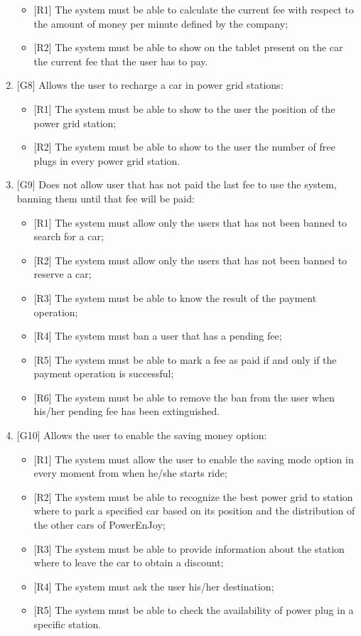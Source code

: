 \begin{enumerate}
\begin{itemize}
	\item {[R1]} The system must be able to calculate the current fee with respect to the amount of money per minute defined by the company;
	\item {[R2]} The system must be able to show on the tablet present on the car the current fee that the user has to pay.
\end{itemize}

\item {[G8]} Allows the user to recharge a car in power grid stations:

\begin{itemize}
	\item {[R1]} The system must be able to show to the user the position of the power grid station;
	\item {[R2]} The system must be able to show to the user the number of free plugs in every power grid station.
\end{itemize}

\item {[G9]} Does not allow user that has not paid the last fee to use the system, banning them until that fee will be paid:

\begin{itemize}
	\item {[R1]} The system must allow only the users that has not been banned to search for a car;
	\item {[R2]} The system must allow only the users that has not been banned to reserve a car;
	\item {[R3]} The system must be able to know the result of the payment operation;
	\item {[R4]} The system must ban a user that has a pending fee;
	\item {[R5]} The system must be able to mark a fee as paid if and only if the payment operation is successful;
	\item {[R6]} The system must be able to remove the ban from the user when his/her pending fee has been extinguished.
\end{itemize}

\item {[G10]} Allows the user to enable the saving money option:

\begin{itemize}
	\item {[R1]} The system must allow the user to enable the saving mode option in every moment from when he/she starts ride;
	\item {[R2]} The system must be able to recognize the best power grid to station where to park a specified car based on its position and the distribution of the other cars of PowerEnJoy;
	\item {[R3]} The system must be able to provide information about the station where to leave the car to obtain a discount;
	\item {[R4]} The system must ask the user his/her destination;
	\item {[R5]} The system must be able to check the availability of power plug in a specific station.
\end{itemize}


\end{enumerate}
